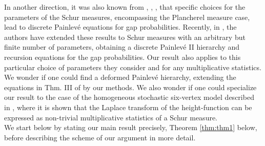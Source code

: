 \documentclass[12pt]{amsart}
\theoremstyle{definition}
\begin{document}
In another direction, it was also known from \cite{borodinpainleve}, \cite{baikrhp}, \cite{adlervanmoerbeke}, that specific choices for the parameters of the Schur measures, encompassing the Plancherel measure case, lead to discrete Painlev\'e equations for gap probabilities. Recently, in \cite{chouteautarricone}, the authors have extended these results to Schur measures with an arbitrary but finite number of parameters, obtaining a discrete Painlev\'e II hierarchy and recursion equations for the gap probabilities. Our result also applies to this particular choice of parameters they consider and for any multiplicative statistics. We wonder if one could find a deformed Painlev\'e hierarchy, extending the equations in Thm. III of \cite{cafassoruzza} by our methods. We also wonder if one could specialize our result to the case  of the homogeneous stochastic six-vertex model described in \cite{borodinsixvertex}, where it is shown that the Laplace transform of the height-function can be expressed as non-trivial multiplicative statistics of a Schur measure.\\

We start below by stating our main result precisely, Theorem \ref{thm:thm1} below, before describing the scheme of our argument in more detail.
\end{document}
